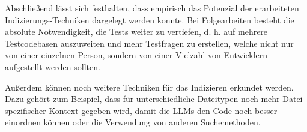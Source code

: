 \documentclass[../main.tex]{subfiles}
\begin{document}
Abschließend lässt sich festhalten, dass empirisch das Potenzial der erarbeiteten Indizierungs-Techniken dargelegt werden konnte.
Bei Folgearbeiten besteht die absolute Notwendigkeit, die Tests weiter zu vertiefen, d. h. auf mehrere Testcodebasen auszuweiten und mehr Testfragen zu erstellen, welche nicht nur von einer einzelnen Person, sondern von einer Vielzahl von Entwicklern aufgestellt werden sollten.

Außerdem können noch weitere Techniken für das Indizieren erkundet werden.
Dazu gehört zum Beispiel, dass für unterschiedliche Dateitypen noch mehr Datei spezifischer Kontext gegeben wird, damit die \glspl{LLM} den Code noch besser einordnen können oder die Verwendung von anderen Suchemethoden.
\end{document}
